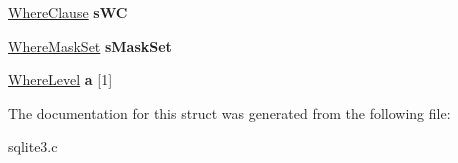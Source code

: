\begin{DoxyCompactItemize}
\item 
\hyperlink{structWhereClause}{Where\+Clause} {\bfseries s\+WC}\hypertarget{structWhereInfo_ab5690a0fa9f78c25a79dd9e50d747fdf}{}\label{structWhereInfo_ab5690a0fa9f78c25a79dd9e50d747fdf}

\item 
\hyperlink{structWhereMaskSet}{Where\+Mask\+Set} {\bfseries s\+Mask\+Set}\hypertarget{structWhereInfo_ae51ef2af01420b9370a844ee32cc5fc5}{}\label{structWhereInfo_ae51ef2af01420b9370a844ee32cc5fc5}

\item 
\hyperlink{structWhereLevel}{Where\+Level} {\bfseries a} \mbox{[}1\mbox{]}\hypertarget{structWhereInfo_a427337160cbeaf64b23a8241fb10dbf9}{}\label{structWhereInfo_a427337160cbeaf64b23a8241fb10dbf9}

\end{DoxyCompactItemize}


The documentation for this struct was generated from the following file\+:\begin{DoxyCompactItemize}
\item 
sqlite3.\+c\end{DoxyCompactItemize}
